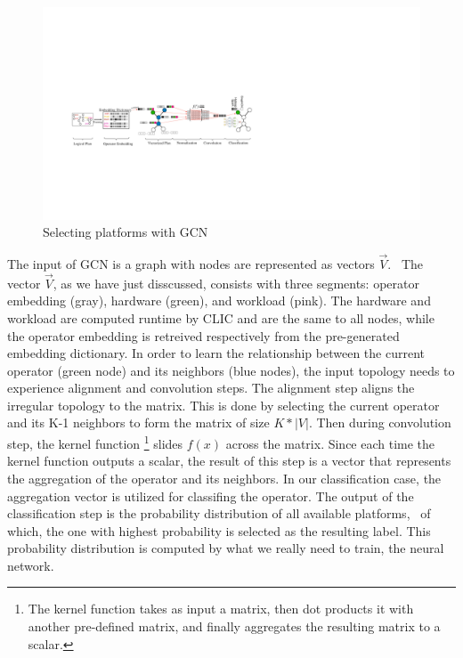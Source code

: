 \begin{figure}
  \centering
  \includegraphics[width=\linewidth]{figures/GCN-new.pdf}
  \caption{Selecting platforms with GCN}
  \label{fig:gcn}
\end{figure}

The input of GCN is a graph with nodes are represented as vectors $\vec{V}$. \
The vector $\vec{V}$, as we have just disscussed, consists with three segments: operator embedding (gray), hardware (green), and workload (pink).
The hardware and workload are computed runtime by CLIC and are the same to all nodes, 
while the operator embedding is retreived respectively from the pre-generated embedding dictionary.
In order to learn the relationship between the current operator (green node) and its neighbors (blue nodes), 
the input topology needs to experience alignment and convolution steps.
The alignment step aligns the irregular topology to the matrix. 
This is done by selecting the current operator and its K-1 neighbors to form the matrix of size $K * |V|$. 
Then during convolution step, the kernel function \footnote{The kernel function takes as input a matrix, 
then dot products it with another pre-defined matrix, 
and finally aggregates the resulting matrix to a scalar.} slides $f(x)$ across the matrix.
Since each time the kernel function outputs a scalar, the result of this step is a vector that represents the aggregation of the operator and its neighbors. 
In our classification case, the aggregation vector is utilized for classifing the operator.
The output of the classification step is the probability distribution of all available platforms, \
of which, the one with highest probability is selected as the resulting label.
This probability distribution is computed by what we really need to train, the neural network.


